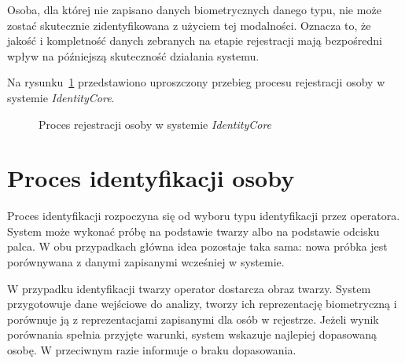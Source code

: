 Osoba, dla której nie zapisano danych biometrycznych danego typu, nie może zostać skutecznie zidentyfikowana z użyciem tej modalności. Oznacza to, że jakość i kompletność danych zebranych na etapie rejestracji mają bezpośredni wpływ na późniejszą skuteczność działania systemu.

\bigskip
\bigskip

Na rysunku~\ref{fig:rejestracja-osoby} przedstawiono uproszczony przebieg procesu rejestracji osoby w systemie \textit{IdentityCore}.

\begin{figure}[htbp]
    \centering
    \caption{Proces rejestracji osoby w systemie \textit{IdentityCore}}
    \label{fig:rejestracja-osoby}
\end{figure}

\section{Proces identyfikacji osoby}

Proces identyfikacji rozpoczyna się od wyboru typu identyfikacji przez operatora. System może wykonać próbę na podstawie twarzy albo na podstawie odcisku palca. W obu przypadkach główna idea pozostaje taka sama: nowa próbka jest porównywana z danymi zapisanymi wcześniej w systemie.

W przypadku identyfikacji twarzy operator dostarcza obraz twarzy. System przygotowuje dane wejściowe do analizy, tworzy ich reprezentację biometryczną i porównuje ją z reprezentacjami zapisanymi dla osób w rejestrze. Jeżeli wynik porównania spełnia przyjęte warunki, system wskazuje najlepiej dopasowaną osobę. W przeciwnym razie informuje o braku dopasowania.

